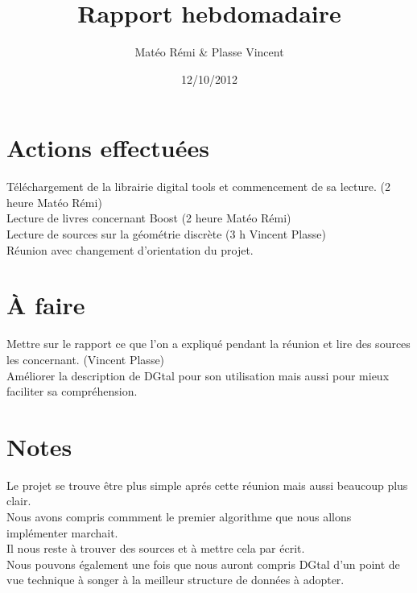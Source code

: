 \documentclass{article}
\title{Rapport hebdomadaire}
\author{Matéo Rémi \& Plasse Vincent}
\date{12/10/2012}
\begin{document}
\maketitle

\section{Actions effectuées}
Téléchargement de la librairie digital tools et commencement de sa lecture. (2 heure Matéo Rémi) \\
Lecture de livres concernant Boost (2 heure Matéo Rémi) \\
Lecture de sources sur la géométrie discrète (3 h Vincent Plasse) \\
Réunion avec changement d'orientation du projet.  \\

\section{À faire} 
Mettre sur le rapport ce que l'on a expliqué pendant la réunion et lire des sources les concernant. (Vincent Plasse) \\
Améliorer la description de DGtal pour son utilisation mais aussi pour mieux faciliter sa compréhension.\\


\section{Notes}

Le projet se trouve être plus simple aprés cette réunion mais aussi beaucoup plus clair. \\
Nous avons compris commment le premier algorithme que nous allons implémenter marchait. \\
Il nous reste à trouver des sources et à mettre cela par écrit. \\

Nous pouvons également une fois que nous auront compris DGtal d'un point de vue technique à songer à la meilleur structure de données à adopter. \\
\end{document}
